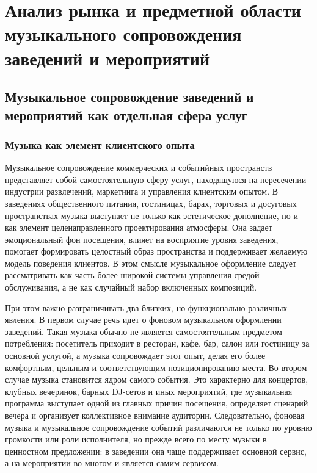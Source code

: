 \chapter{Анализ рынка и предметной области музыкального сопровождения заведений и мероприятий}
\label{ch:market}

\section{Музыкальное сопровождение заведений и мероприятий как отдельная сфера услуг}
\label{sec:market:music-service}

\subsection{Музыка как элемент клиентского опыта}

Музыкальное сопровождение коммерческих и событийных пространств представляет собой самостоятельную сферу услуг, находящуюся на пересечении индустрии развлечений, маркетинга и управления клиентским опытом. В заведениях общественного питания, гостиницах, барах, торговых и досуговых пространствах музыка выступает не только как эстетическое дополнение, но и как элемент целенаправленного проектирования атмосферы. Она задает эмоциональный фон посещения, влияет на восприятие уровня заведения, помогает формировать целостный образ пространства и поддерживает желаемую модель поведения клиентов. В этом смысле музыкальное оформление следует рассматривать как часть более широкой системы управления средой обслуживания, а не как случайный набор включенных композиций.

При этом важно разграничивать два близких, но функционально различных явления. В первом случае речь идет о фоновом музыкальном оформлении заведений. Такая музыка обычно не является самостоятельным предметом потребления: посетитель приходит в ресторан, кафе, бар, салон или гостиницу за основной услугой, а музыка сопровождает этот опыт, делая его более комфортным, цельным и соответствующим позиционированию места. Во втором случае музыка становится ядром самого события. Это характерно для концертов, клубных вечеринок, барных DJ-сетов и иных мероприятий, где музыкальная программа выступает одной из главных причин посещения, определяет сценарий вечера и организует коллективное внимание аудитории. Следовательно, фоновая музыка и музыкальное сопровождение событий различаются не только по уровню громкости или роли исполнителя, но прежде всего по месту музыки в ценностном предложении: в заведении она чаще поддерживает основной сервис, а на мероприятии во многом и является самим сервисом.

